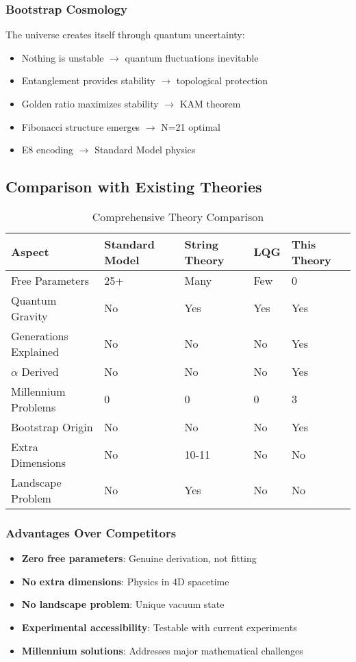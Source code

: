 \documentclass[12pt,a4paper]{article}
\begin{document}
\subsubsection{Bootstrap Cosmology}
The universe creates itself through quantum uncertainty:

\begin{itemize}
\item Nothing is unstable $\rightarrow$ quantum fluctuations inevitable
\item Entanglement provides stability $\rightarrow$ topological protection
\item Golden ratio maximizes stability $\rightarrow$ KAM theorem
\item Fibonacci structure emerges $\rightarrow$ N=21 optimal
\item E8 encoding $\rightarrow$ Standard Model physics
\end{itemize}

\subsection{Comparison with Existing Theories}

\begin{table}[H]
\centering
\caption{Comprehensive Theory Comparison}
\begin{tabular}{@{}lllll@{}}
\toprule
Aspect & Standard Model & String Theory & LQG & This Theory \\
\midrule
Free Parameters & 25+ & Many & Few & 0 \\
Quantum Gravity & No & Yes & Yes & Yes \\
Generations Explained & No & No & No & Yes \\
$\alpha$ Derived & No & No & No & Yes \\
Millennium Problems & 0 & 0 & 0 & 3 \\
Bootstrap Origin & No & No & No & Yes \\
Extra Dimensions & No & 10-11 & No & No \\
Landscape Problem & No & Yes & No & No \\
\bottomrule
\end{tabular}
\end{table}

\subsubsection{Advantages Over Competitors}
\begin{itemize}
\item \textbf{Zero free parameters}: Genuine derivation, not fitting
\item \textbf{No extra dimensions}: Physics in 4D spacetime
\item \textbf{No landscape problem}: Unique vacuum state
\item \textbf{Experimental accessibility}: Testable with current experiments
\item \textbf{Millennium solutions}: Addresses major mathematical challenges
\end{itemize}
\end{document}

